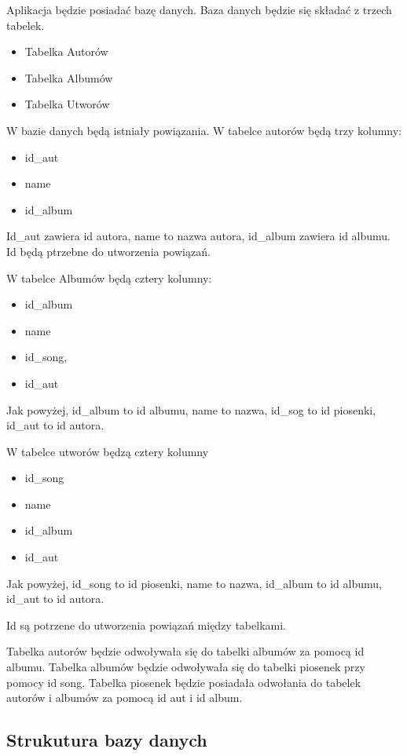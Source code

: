 
Aplikacja będzie posiadać bazę danych. Baza danych będzie się składać z trzech tabelek.

\begin{itemize}
	\item Tabelka Autorów
	\item Tabelka Albumów
	\item Tabelka Utworów
\end{itemize}

W bazie danych będą istniały powiązania. W tabelce autorów będą trzy kolumny:
\begin{itemize}
	\item id\_aut
	\item name
	\item id\_album
\end{itemize}
Id\_aut zawiera id autora, name to nazwa autora, id\_album zawiera id albumu. Id będą ptrzebne do utworzenia powiązań.

W tabelce Albumów będą cztery kolumny:
\begin{itemize}
	\item id\_album
	\item name
	\item id\_song,
	\item id\_aut
\end{itemize}
Jak powyżej, id\_album to id albumu, name to nazwa, id\_sog to id piosenki, id\_aut to id autora.

W tabelce utworów będzą cztery kolumny
\begin{itemize}
	\item id\_song
	\item name
	\item id\_album
	\item id\_aut
\end{itemize}

Jak powyżej, id\_song to id piosenki, name to nazwa, id\_album to id albumu, id\_aut to id autora.

Id są potrzene do utworzenia powiązań między tabelkami.

Tabelka autorów będzie odwoływała się do tabelki albumów za pomocą id albumu. Tabelka albumów będzie odwoływała się do tabelki piosenek przy pomocy id song. Tabelka piosenek będzie posiadała odwołania do tabelek autorów i albumów za pomocą id aut i id album.

\subsection{Strukutura bazy danych}
